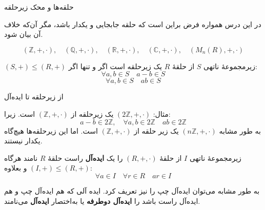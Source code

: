 \begin{frame}[t]{حلقه‌ها و محک زیرحلقه}

    \begin{remark}
        در این درس همواره فرض براین است که حلقه جابجایی و یکدار باشد، مگر آن‌که خلاف آن بیان شود.
    \end{remark}

    \begin{example}
        \[
            (\mathbb{Z}, +, \cdot),\quad (\mathbb{Q}, +, \cdot),\quad (\mathbb{R}, +, \cdot),\quad (\mathbb{C}, +, \cdot),\quad (M_n(R), +, \cdot)
        \]
    \end{example}


    \begin{definition}
        $(S, +) \leqslant (R, +)$ زیرمجموعهٔ ناتهی $S$ از حلقهٔ $R$ یک زیرحلقه است اگر و تنها اگر:
        \[
            \forall a, b \in S \quad a - b \in S
        \]
        \[
            \forall a, b \in S \quad ab \in S
        \]

    \end{definition}


\end{frame}

\begin{frame}[t]{از زیرحلقه تا ایده‌آل}
    \begin{remark}
        مثال: $(2\mathbb{Z}, +, \cdot)$ یک زیرحلقه از $(\mathbb{Z}, +, \cdot)$ است.
        زیرا:
        \[
            a - b \in 2\mathbb{Z}, \quad \forall a,b \in 2\mathbb{Z} \quad ab \in 2\mathbb{Z}
        \]
        به طور مشابه
        $(n\mathbb{Z}, +, \cdot)$
        یک زیر حلقه از
        $(\mathbb{Z}, +, \cdot)$
        است.
        اما این زیرحلقه‌ها هیچ‌گاه یکدار نیستند.
    \end{remark}


    \begin{definition}[ایده‌آل]
        زیرمجموعهٔ ناتهی $I$ از حلقهٔ $(R,+,\cdot)$ را یک \textbf{ایده‌آل} راست حلقهٔ $R$ نامند هرگاه
        \((I,+) \leqslant (R, +)\)
        و بعلاوه:
        \[
            \forall a \in I \quad \forall r \in R \quad ar \in I
        \]

        به طور مشابه می‌توان ایده‌آل چپ را نیز تعریف کرد.
        ایده آلی که هم ایده‌آل چپ و هم ایده‌آل راست باشد را
        \textbf{ایده‌آل دوطرفه} یا به‌اختصار \textbf{ایده‌آل} می‌نامند.
    \end{definition}




\end{frame}

